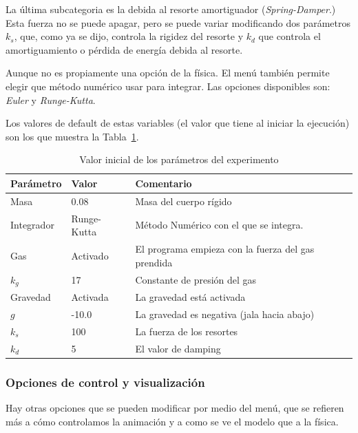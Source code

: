 La última subcategoria es la debida al resorte amortiguador (\emph{\textenglish{Spring-Damper}}.)
Esta fuerza no se puede apagar, pero se puede variar modificando dos parámetros $k_{s}$, que, como ya se dijo, controla la rigidez del resorte y $k_{d}$ que controla el amortiguamiento o pérdida de energía debida al resorte.

Aunque no es propiamente una opción de la física. El menú también permite elegir que método numérico usar para integrar.
Las opciones disponibles son: \emph{Euler} y \emph{Runge-Kutta}.

Los valores de default de estas variables (el valor que tiene al iniciar la ejecución) son los que muestra la Tabla~\ref{valores:variables}.

\begin{table}
\begin{center}
\begin{tabular} {@{}llp{10cm}@{}}
\toprule
Parámetro & Valor & Comentario\\
\midrule
 Masa & 0.08 & Masa del cuerpo rígido \\
 Integrador & Runge-Kutta & Método Numérico con el que se integra. \\
 Gas & Activado & El programa empieza con la fuerza del gas prendida \\
 $k_g$ & 17 & Constante de presión del gas \\
 Gravedad & Activada & La gravedad está activada \\
 $g$ & -10.0 & La gravedad es negativa (jala hacia abajo) \\
 $k_s$ & 100 & La fuerza de los resortes \\
 $k_d$ & 5 & El valor de damping \\
\bottomrule
\end{tabular}
\end{center}
\caption[Valores por defecto de las variables físicas]{Valor inicial de los parámetros del experimento}
\label{valores:variables}
\end{table}

\subsubsection{Opciones de control y visualización}
Hay otras opciones que se pueden modificar por medio del menú, que se refieren más a cómo controlamos la animación y a como se ve el modelo que a la física.

